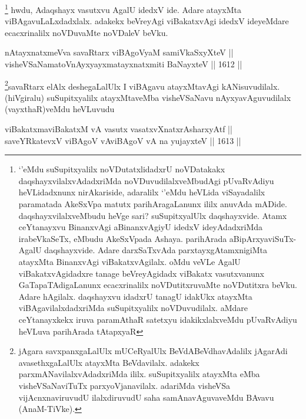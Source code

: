 \begin{artha}
\footnote{`\stext'eMdu suSupitxyalilx noVDutatxlidadxrU noVDatakakx daqshayxvilalxvAdadxriMda noVDuvudilalxveMbudAgi pUvaRvAdiyu heVLidadxnunx nirAkariside, adaralilx `\stext'eMdu heVLida viSayadalilx paramatada AkeSxVpa matutx parihAragaLanunx ililx anuvAda mADide. daqshayxvilalxveMbudu heVge sari? suSupitxyalUlx daqshayxvide. Atamx ceYtanayxvu BinanxvAgi aBinanxvAgiyU idedxV ideyAdadxriMda irabeVkaSeTx, eMbudu AkeSxVpada Ashaya. parihArada aBipArxyaviSuTx- AgalU daqshayxvide. Adare darxSaTxvAda parxtayxgAtamxnigiMta atayxMta BinanxvAgi viBakatxvAgilalx. oMdu veVLe AgalU viBakatxvAgidadxre tanage beVreyAgidadx viBakatx vasutxvanunx GaTapaTAdigaLanunx ecacxrinalilx noVDutitxruvaMte noVDutitxra beVku. Adare hAgilalx. daqshayxvu idadxrU tanagU idakUkx atayxMta viBAgavilalxdadxriMda suSupitxyalilx noVDuvudilalx. aMdare ceYtanayxkekx iruva paramAthaR satetxyu idakikxlalxveMdu pUvaRvAdiyu heVLuva parihArada tAtapxyaR}
hwdu, Adaqshayx vasutxvu AgalU idedxV ide. Adare atayxMta viBAgavuLaLxdadxlalx. adakekx beVreyAgi viBakatxvAgi idedxV ideyeMdare ecacxrinalilx noVDuvaMte noVDaleV beVku.
\end{artha}


\begin{shl}
nAtayxnatxmeVva savaRtarx viBAgoV\s yaM samiVkaSxyXteV || \\
visheVSaNamatoV\s nAyxyayxmatayxnatxmiti BaNayxteV \hfill || 1612 ||  
\end{shl}

\begin{artha}
\footnote{jAgara savxpanxgaLalUlx mUCeRyalUlx BeVdABeVdhavAdalilx jAgarAdi avasethxgaLalUlx atayxMta BeVdavilalx. adakekx parxmANavilalxvAdadxriMda ililx. suSupitxyalilx atayxMta eMba visheVSaNaviTuTx parxyoVjanavilalx. adariMda visheVSa vijAcnxnaviruvudU ilalxdiruvudU saha samAnavAguvaveMdu BAvavu (AnaM-TiVke).}savaRtarx elAlx deshegaLalUlx I viBAgavu atayxMtavAgi kANisuvudilalx. (hiVgiralu) suSupitxyalilx atayxMtaveMba visheVSaNavu nAyxyavAguvudilalx (vayxthaR)veMdu heVLuvudu
\end{artha}


\begin{shl}
viBakatxmaviBakatxM vA vasutx vasatxvXnatxrAsharxyAtf ||  \\
saveYRkatevxV viBAgoV vA\s viBAgoV vA na yujayxteV \hfill || 1613 ||  
\end{shl}

